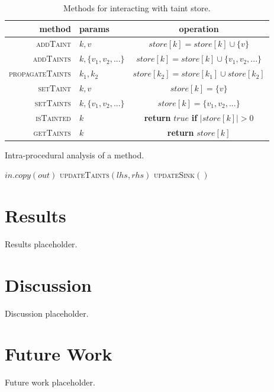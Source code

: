 \documentclass[acmsmall]{acmart}
\begin{document}
\begin{center}
  \begin{table}
  \caption{Methods for interacting with taint store.}
  \renewcommand{\arraystretch}{1.3}
    \begin{tabular}{ |rl||c| } 
      \hline
      method & params & operation \\ 
      \hline
      \textsc{addTaint} & $k,v$ & $store[k] = store[k]\cup\{v\}$ \\ 
      \textsc{addTaints} & $k,\{v_1, v_2,...\}$ & $store[k] = store[k]\cup\{v_1, v_2,...\}$ \\ 
      
      \textsc{propagateTaints} & $k_1, k_2$ & $store[k_2] = store[k_1]\cup store[k_2]$  \\ 

      \textsc{setTaint} & $k,v$ & $store[k] = \{v\}$ \\ 
      \textsc{setTaints} & $k,\{v_1, v_2,...\}$ & $store[k] = \{v_1, v_2,...\}$ \\ 

      \textsc{isTainted} & $k$ & \textbf{return} $true$ \textbf{if} $|store[k]| > 0$ \\ 
      \textsc{getTaints} & $k$ & \textbf{return} $store[k]$ \\ 
      \hline
    \end{tabular}
  \end{table}
\end{center}

\begin{algorithm}
  \caption{Intra-procedural analysis of a method.}
  \label{alg1}
\begin{algorithmic}[1]
    \State $in.copy(out)$ 
     
    \State \textsc{updateTaints}$(lhs,rhs)$ 
    \EndIf
    \State \textsc{updateSink}$()$ 
  \EndProcedure
\end{algorithmic}
\end{algorithm}


\section{Results}
Results placeholder.

\section{Discussion}
Discussion placeholder.

\section{Future Work}
Future work placeholder.~\cite{Test_Bib}



\end{document}
